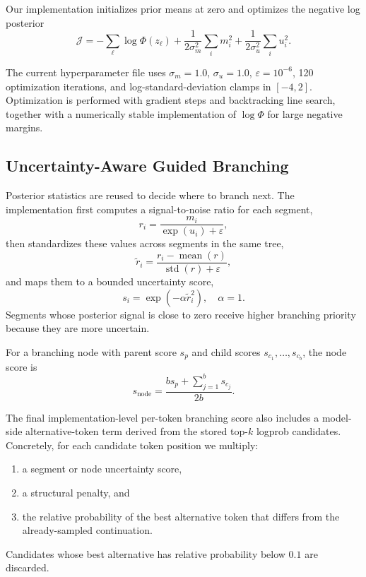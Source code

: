 \documentclass[letterpaper]{article} %
\begin{document}
Our implementation initializes prior means at zero and optimizes the negative log posterior
\begin{equation}
\mathcal{J} = -\sum_\ell \log \Phi(z_\ell)
+ \frac{1}{2\sigma_m^2}\sum_i m_i^2
+ \frac{1}{2\sigma_u^2}\sum_i u_i^2.
\end{equation}

The current hyperparameter file uses
$\sigma_m = 1.0$,
$\sigma_u = 1.0$,
$\varepsilon = 10^{-6}$,
120 optimization iterations, and log-standard-deviation clamps in $[-4,2]$.
Optimization is performed with gradient steps and backtracking line search, together with a numerically stable implementation of $\log \Phi$ for large negative margins.

\subsection{Uncertainty-Aware Guided Branching}
Posterior statistics are reused to decide where to branch next. The implementation first computes a signal-to-noise ratio for each segment,
\begin{equation}
r_i = \frac{m_i}{\exp(u_i) + \varepsilon},
\end{equation}
then standardizes these values across segments in the same tree,
\begin{equation}
\tilde{r}_i = \frac{r_i - \operatorname{mean}(r)}{\operatorname{std}(r)+\varepsilon},
\end{equation}
and maps them to a bounded uncertainty score,
\begin{equation}
s_i = \exp(-\alpha \tilde{r}_i^2), \quad \alpha = 1.
\end{equation}
Segments whose posterior signal is close to zero receive higher branching priority because they are more uncertain.

For a branching node with parent score $s_p$ and child scores $s_{c_1},\dots,s_{c_b}$, the node score is
\begin{equation}
s_{\text{node}} = \frac{b s_p + \sum_{j=1}^{b} s_{c_j}}{2b}.
\end{equation}

The final implementation-level per-token branching score also includes a model-side alternative-token term derived from the stored top-$k$ logprob candidates. Concretely, for each candidate token position we multiply:
\begin{enumerate}
    \item a segment or node uncertainty score,
    \item a structural penalty, and
    \item the relative probability of the best alternative token that differs from the already-sampled continuation.
\end{enumerate}
Candidates whose best alternative has relative probability below $0.1$ are discarded.
\end{document}
